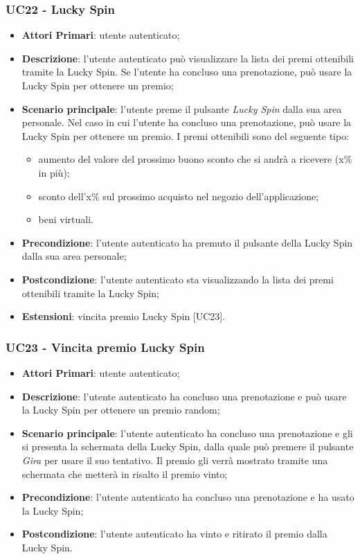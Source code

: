 

\subsubsection{UC22 - Lucky Spin}
\begin{itemize}
	\item \textbf{Attori Primari}: utente autenticato;
	\item \textbf{Descrizione}:	l'utente autenticato può visualizzare la lista dei premi ottenibili tramite la Lucky Spin\glo. Se l'utente ha concluso una prenotazione, può usare la Lucky Spin per ottenere un premio;
	\item \textbf{Scenario principale}: l'utente preme il pulsante \textit{Lucky Spin} dalla sua area personale. Nel caso in cui l'utente ha concluso una prenotazione, può usare la Lucky Spin per ottenere un premio. I premi ottenibili sono del seguente tipo:
	\begin{itemize}
		\item aumento del valore del prossimo buono sconto che si andrà a ricevere (x\% in più);
		\item sconto dell'x\% sul prossimo acquisto nel negozio dell'applicazione;
		\item beni virtuali.
	\end{itemize}
	\item \textbf{Precondizione}: l'utente autenticato ha premuto il pulsante della Lucky Spin dalla sua area personale;
	\item \textbf{Postcondizione}: l'utente autenticato sta visualizzando la lista dei premi ottenibili tramite la Lucky Spin;
	\item \textbf{Estensioni}: vincita premio Lucky Spin [UC23].
\end{itemize}
\subsubsection{UC23 - Vincita premio Lucky Spin}
\begin{itemize}
	\item \textbf{Attori Primari}: utente autenticato;
	\item \textbf{Descrizione}: l'utente autenticato ha concluso una prenotazione e può usare la Lucky Spin per ottenere un premio random;	
	\item \textbf{Scenario principale}: l'utente autenticato ha concluso una prenotazione e gli si presenta la schermata della Lucky Spin, dalla quale può premere il pulsante \textit{Gira} per usare il suo tentativo. Il premio gli verrà mostrato tramite una schermata che metterà in risalto il premio vinto;
	\item \textbf{Precondizione}: l'utente autenticato ha concluso una prenotazione e ha usato la Lucky Spin;
	\item \textbf{Postcondizione}: l'utente autenticato ha vinto e ritirato il premio dalla Lucky Spin.
\end{itemize}

